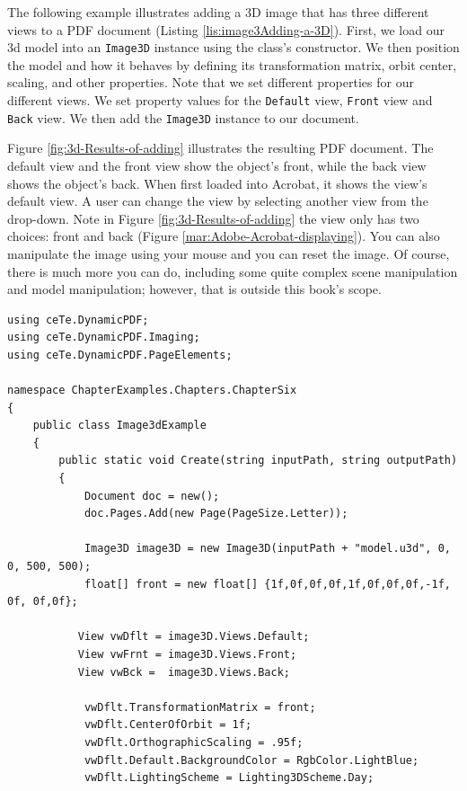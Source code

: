\documentclass[american,letterpaper]{tufte-book}
\numberwithin{equation}{section}
\numberwithin{figure}{section}
\begin{document}
{The following example illustrates adding a 3D image that has three
different views to a PDF document (Listing \ref{lis:image3Adding-a-3D}).
First, we load our 3d model into an \texttt{Image3D} instance using the class's
constructor. We then position the model and how it behaves by defining
its transformation matrix, orbit center, scaling, and other properties. Note that we set different properties for our different views. We
set property values for the \texttt{Default} view, \texttt{Front}
view and \texttt{Back} view. We then add the \texttt{Image3D} instance
to our document.

Figure \ref{fig:3d-Results-of-adding} illustrates the resulting PDF
document. The default view and the front view show the object's front,
while the back view shows the object's back. When first loaded into
Acrobat, it shows the view's default view. A user can change the view
by selecting another view from the drop-down. Note in Figure
\ref{fig:3d-Results-of-adding} the view only has two choices: front
and back (Figure \ref{mar:Adobe-Acrobat-displaying}). You can also
manipulate the image using your mouse and you can reset the image.
Of course, there is much more you can do, including some quite complex
scene manipulation and model manipulation; however, that is outside
this book's scope.

\bgroup{}
\begin{lstlisting}[caption={Adding a 3D image.},label={lis:image3Adding-a-3D},basicstyle={\small\ttfamily},breaklines=true]
using ceTe.DynamicPDF;
using ceTe.DynamicPDF.Imaging;
using ceTe.DynamicPDF.PageElements;

namespace ChapterExamples.Chapters.ChapterSix
{
    public class Image3dExample
    {
        public static void Create(string inputPath, string outputPath)
        {
            Document doc = new();
            doc.Pages.Add(new Page(PageSize.Letter));
            
            Image3D image3D = new Image3D(inputPath + "model.u3d", 0, 0, 500, 500);
            float[] front = new float[] {1f,0f,0f,0f,1f,0f,0f,0f,-1f, 0f, 0f,0f};

           View vwDflt = image3D.Views.Default;
           View vwFrnt = image3D.Views.Front;
           View vwBck =  image3D.Views.Back;

            vwDflt.TransformationMatrix = front;
            vwDflt.CenterOfOrbit = 1f;
            vwDflt.OrthographicScaling = .95f;
            vwDflt.Default.BackgroundColor = RgbColor.LightBlue;
            vwDflt.LightingScheme = Lighting3DScheme.Day;


\end{lstlisting}}
\end{document}
